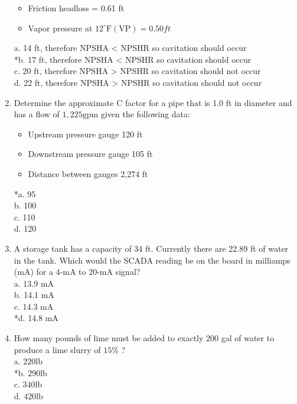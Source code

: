 \begin{enumerate}
\begin{itemize}
  \item Friction headloss = 0.61 ft\\
  \item Vapor pressure at $12^{\circ} \mathrm{F}(\mathrm{VP})=0.50 ft$\\
\end{itemize}
a. 14 ft, therefore NPSHA < NPSHR so cavitation should occur\\
*b. 17 ft, therefore NPSHA < NPSHR so cavitation should occur\\
c. 20 ft, therefore NPSHA > NPSHR so cavitation should not occur\\
d. 22 ft, therefore NPSHA > NPSHR so cavitation should not occur\\
  \item Determine the approximate $\mathrm{C}$ factor for a pipe that is 1.0 ft in diameter and has a flow of $1,225 \mathrm{gpm}$ given the following data:\\
\begin{itemize}
  \item Upstream pressure gauge 120 ft\\
  \item Downstream pressure gauge 105 ft\\
  \item Distance between gauges 2,274 ft\\
  \end{itemize}
*a. 95\\
b. 100\\
c. 110\\
d. 120\\
  \item A storage tank has a capacity of 34 ft. Currently there are 22.89 ft of water in the tank. Which would the SCADA reading be on the board in milliamps (mA) for a 4-mA to 20-mA signal?\\
a. 13.9 mA\\
b. 14.1 mA\\
c. 14.3 mA\\
*d. 14.8 mA\\

  \item How many pounds of lime must be added to exactly 200 gal of water to produce a lime slurry of $15 \%$ ?\\
a. $220 \mathrm{lb}$\\
*b. $290 \mathrm{lb}$\\
c. $340 \mathrm{lb}$\\
d. $420 \mathrm{lb}$ \\


\end{enumerate}
